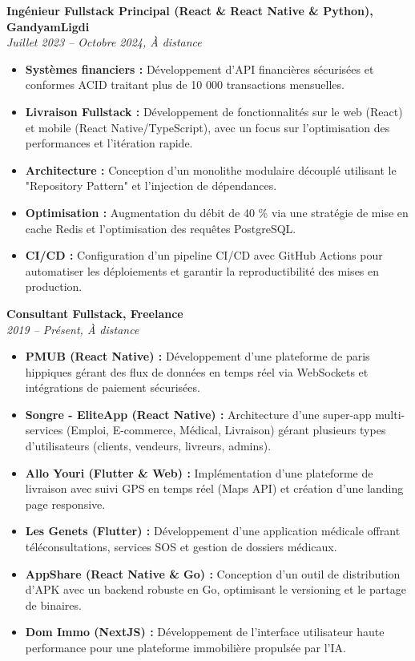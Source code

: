 \documentclass[a4paper,10pt]{article}
\newcommand{\jobheader}[4]{%
    \textbf{#1, #2} \\
    \textit{#3, #4}
    \vspace{0.05cm}
}
\begin{document}
\vspace{0.15cm}

\jobheader{Ingénieur Fullstack Principal (React \& React Native \& Python)}{GandyamLigdi}{Juillet 2023 -- Octobre 2024}{À distance}
\begin{itemize}[leftmargin=*,nosep]
    \item \textbf{Systèmes financiers :} Développement d'API financières sécurisées et conformes ACID traitant plus de 10 000 transactions mensuelles.
    \item \textbf{Livraison Fullstack :} Développement de fonctionnalités sur le web (React) et mobile (React Native/TypeScript), avec un focus sur l'optimisation des performances et l'itération rapide.
    \item \textbf{Architecture :} Conception d'un monolithe modulaire découplé utilisant le "Repository Pattern" et l'injection de dépendances.
    \item \textbf{Optimisation :} Augmentation du débit de 40 \% via une stratégie de mise en cache Redis et l'optimisation des requêtes PostgreSQL.
    \item \textbf{CI/CD :} Configuration d'un pipeline CI/CD avec GitHub Actions pour automatiser les déploiements et garantir la reproductibilité des mises en production.
\end{itemize}

\vspace{0.15cm}

\jobheader{Consultant Fullstack}{Freelance}{2019 -- Présent}{À distance}
\begin{itemize}[leftmargin=*,nosep]
    \item \textbf{PMUB (React Native) :} Développement d'une plateforme de paris hippiques gérant des flux de données en temps réel via WebSockets et intégrations de paiement sécurisées.
    \item \textbf{Songre - EliteApp (React Native) :} Architecture d'une super-app multi-services (Emploi, E-commerce, Médical, Livraison) gérant plusieurs types d'utilisateurs (clients, vendeurs, livreurs, admins).
    \item \textbf{Allo Youri (Flutter \& Web) :} Implémentation d'une plateforme de livraison avec suivi GPS en temps réel (Maps API) et création d'une landing page responsive.
    \item \textbf{Les Genets (Flutter) :} Développement d'une application médicale offrant téléconsultations, services SOS et gestion de dossiers médicaux.
    \item \textbf{AppShare (React Native \& Go) :} Conception d'un outil de distribution d'APK avec un backend robuste en Go, optimisant le versioning et le partage de binaires.
    \item \textbf{Dom Immo (NextJS) :} Développement de l'interface utilisateur haute performance pour une plateforme immobilière propulsée par l'IA.
\end{itemize}
\end{document}
